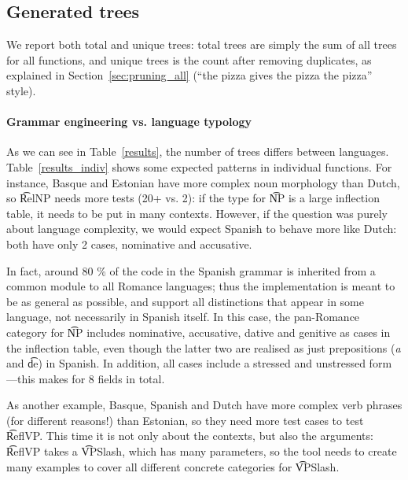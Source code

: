 \subsection{Generated trees}

We report both total and unique trees: total trees are simply the sum
of all trees for all functions, and unique trees is the count after
removing duplicates, as explained in Section~\ref{sec:pruning_all}
(``the pizza gives the pizza the pizza'' style).

\paragraph{Grammar engineering vs. language typology}
As we can see in Table~\ref{results}, the number of trees differs between
languages. Table~\ref{results_indiv} shows some expected patterns in
individual functions. For instance, Basque and Estonian have more
complex noun morphology than Dutch, so \t{RelNP} needs more tests (20+
vs. 2): if the type for \t{NP} is a large inflection table, it needs
to be put in many contexts. However, if the question was purely about
language complexity, we would expect Spanish to behave more like
Dutch: both have only 2 cases, nominative and accusative.

In fact, around 80 \% of the code in the Spanish grammar is inherited
from a common module to all Romance languages; thus the implementation
is meant to be as general as possible, and support all distinctions
that appear in some language, not necessarily in Spanish itself. In
this case, the pan-Romance category for \t{NP} includes nominative,
accusative, dative and genitive as cases in the inflection table, even
though the latter two are realised as just prepositions (\emph{a} and
\t{de}) in Spanish. In addition, all cases include a stressed and
unstressed form---this makes for 8 fields in total.


As another example, Basque, Spanish and Dutch have more complex verb
phrases (for different reasons!) than Estonian, so they need more test
cases to test \t{ReflVP}. This time it is not only about the contexts,
but also the arguments: \t{ReflVP} takes a \t{VPSlash}, which has many
parameters, so the tool needs to create many examples to cover all
different concrete categories for \t{VPSlash}.

